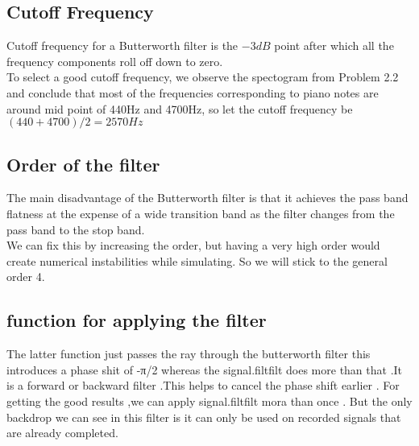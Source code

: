 \documentclass[journal,12pt,twocolumn]{IEEEtran}
\begin{document}
  \subsection{\textbf{Cutoff Frequency}}
  Cutoff frequency for a Butterworth filter is the $-3dB$ point after which all the frequency components roll off down to zero.\\
  To select a good cutoff frequency, we observe the spectogram from Problem 2.2 and conclude that most of the frequencies corresponding to piano notes are around mid point of 440Hz and 4700Hz, so let the cutoff frequency be $(440+4700)/2 = 2570Hz$
  \subsection{\textbf{Order of the filter}}
  The main disadvantage of the Butterworth filter is that it achieves the pass band flatness at the expense of a wide transition band as the filter changes from the pass band to the stop band.\\
  We can fix this by increasing the order, but having a very high order would create numerical instabilities while simulating. So we will stick to the general order 4.
  \subsection{\textbf{function for applying the filter}}
  The latter function just passes the ray through the butterworth filter this introduces a phase shit of -π/2 whereas the signal.filtfilt does more than that .It is a forward or backward filter .This helps to cancel the phase shift earlier . For getting the good results ,we can apply signal.filtfilt mora than once .
  But the only backdrop we can see in this filter is it can only be used on recorded signals that are already completed.
  
\end{document}
